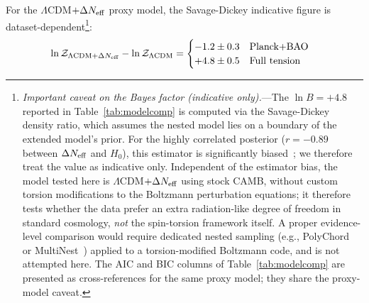 \documentclass[aps,prd,twocolumn,superscriptaddress,showpacs,preprintnumbers,nofootinbib,longbibliography,floatfix]{revtex4-2}
\newcommand{\Neff}{N_{\rm eff}}
\begin{document}
For the $\Lambda$CDM$+\Delta\Neff$ proxy model, the Savage-Dickey indicative figure is dataset-dependent\footnote{\label{fn:bayes_caveat}\emph{Important caveat on the Bayes factor (indicative only).}---The $\ln B = +4.8$ reported in Table~\ref{tab:modelcomp} is computed via the Savage-Dickey density ratio, which assumes the nested model lies on a boundary of the extended model's prior. For the highly correlated posterior ($r = -0.89$ between $\Delta\Neff$ and $H_0$), this estimator is significantly biased~\cite{Trotta2008}; we therefore treat the value as indicative only. Independent of the estimator bias, the model tested here is $\Lambda$CDM$+\Delta\Neff$ using stock CAMB, without custom torsion modifications to the Boltzmann perturbation equations; it therefore tests whether the data prefer an extra radiation-like degree of freedom in standard cosmology, \emph{not} the spin-torsion framework itself. A proper evidence-level comparison would require dedicated nested sampling (e.g., PolyChord~\cite{Handley2015} or MultiNest~\cite{Feroz2009}) applied to a torsion-modified Boltzmann code, and is not attempted here. The AIC and BIC columns of Table~\ref{tab:modelcomp} are presented as cross-references for the same proxy model; they share the proxy-model caveat.}:\label{eq:Zcomb2}
\begin{align}
&\ln \mathcal{Z}_{\Lambda\text{CDM}+\Delta\Neff} - \ln \mathcal{Z}_{\Lambda\text{CDM}} = \begin{cases}
-1.2 \pm 0.3 & \text{Planck+BAO} \\
+4.8 \pm 0.5 & \text{Full tension} \\
\end{cases}
\end{align}
\end{document}
